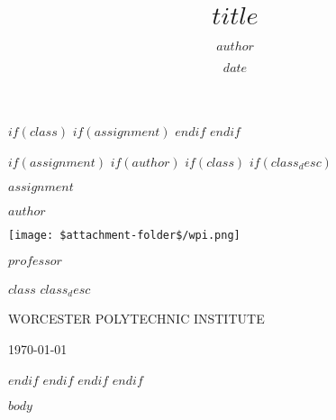 \documentclass[12pt]{article}
\title{$title$}
\author{$author$}
\date{$date$}
\begin{document}
$if(class)$
$if(assignment)$
\pagestyle{fancy}
\fancyhf{}
\renewcommand{\headrulewidth}{0pt}
\fancyfoot[C]{\thepage}
\fancyfoot[R]{\monthyeardate\today}
$endif$
$endif$

$if(assignment)$
$if(author)$
$if(class)$
$if(class_desc)$
\begin{titlepage}
    \centering
    \vspace*{2.5cm}
    
    {\Huge\bfseries $assignment$\par}
    \vspace{0.5cm}
    {\large $author$\par}
    \vspace{2.5cm}
    
    \texttt{[image: \$attachment-folder\$/wpi.png]}
    \vspace{2cm}
    
    {\large $professor$\par}
    \vspace{0.5cm}
    {\large $class$ $class_desc$\par}
    \vspace{0.5cm}
    {\large WORCESTER POLYTECHNIC INSTITUTE\par}
    \vspace{0.5cm}
    {\large\monthyeardate\today\par}
\end{titlepage}
$endif$
$endif$
$endif$
$endif$

$body$
\end{document}

